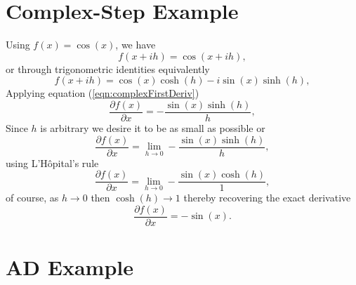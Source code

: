 \documentclass[preprint,12pt]{elsarticle}
\begin{document}
\section{Complex-Step Example}
\label{sec:appendixA}
%
Using $f(x) = \cos(x)$, we have
%
\[
f (x + i h) = \cos(x + i h),
\]
%
or through trigonometric identities equivalently
%
\[
f(x + i h) = \cos(x) \cosh(h) - i \sin(x) \sinh(h),
\]
%
Applying equation (\ref{eqn:complexFirstDeriv})
\[
\frac{\partial f(x)}{\partial x} = - \frac{\sin(x) \sinh(h)}{h},
\]
Since $h$ is arbitrary we desire it to be as small as possible or
\[
\frac{\partial f(x)}{\partial x} = \lim_{h \to 0} - \frac{\sin(x) \sinh(h)}{h},
\]
using L'H\^opital's rule
\[
\frac{\partial f(x)}{\partial x} = \lim_{h \to 0} - \frac{\sin(x) \cosh(h)}{1},
\]
of course, as $h \to 0$ then $\cosh(h) \to 1$ thereby recovering the exact derivative
\[
\frac{\partial f(x)}{\partial x} =-\sin(x).
\]

\section{AD Example}
\label{sec:appendixB}
\end{document}
